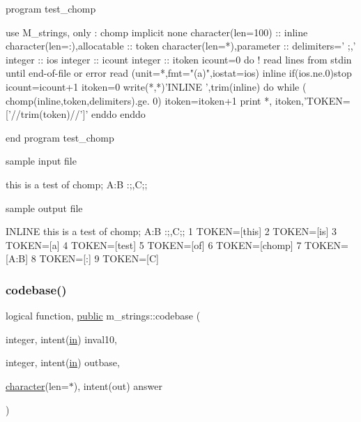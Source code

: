 \begin{DoxyVerb}program test_chomp

   use M_strings, only : chomp
   implicit none
   character(len=100)            :: inline
   character(len=:),allocatable  :: token
   character(len=*),parameter    :: delimiters=' ;,'
   integer                       :: ios
   integer                       :: icount
   integer                       :: itoken
      icount=0
      do        ! read lines from stdin until end-of-file or error
         read (unit=*,fmt="(a)",iostat=ios) inline
         if(ios.ne.0)stop
         icount=icount+1
         itoken=0
         write(*,*)'INLINE ',trim(inline)
         do while ( chomp(inline,token,delimiters).ge. 0)
            itoken=itoken+1
            print *, itoken,'TOKEN=['//trim(token)//']'
         enddo
      enddo

end program test_chomp

sample input file

 this is a test of chomp; A:B :;,C;;

sample output file

 INLINE     this is a test of chomp; A:B :;,C;;
           1 TOKEN=[this]
           2 TOKEN=[is]
           3 TOKEN=[a]
           4 TOKEN=[test]
           5 TOKEN=[of]
           6 TOKEN=[chomp]
           7 TOKEN=[A:B]
           8 TOKEN=[:]
           9 TOKEN=[C] \end{DoxyVerb}
 \mbox{\label{namespacem__strings_a3a022b64dc902dc6043e3f265ee78e38}} 
\subsubsection{\texorpdfstring{codebase()}{codebase()}}
{\footnotesize\ttfamily logical function, \hyperlink{M__stopwatch_83_8txt_a2f74811300c361e53b430611a7d1769f}{public} m\+\_\+strings\+::codebase (\begin{DoxyParamCaption}\item[{integer, intent(\hyperlink{M__journal_83_8txt_afce72651d1eed785a2132bee863b2f38}{in})}]{inval10,  }\item[{integer, intent(\hyperlink{M__journal_83_8txt_afce72651d1eed785a2132bee863b2f38}{in})}]{outbase,  }\item[{\hyperlink{option__stopwatch_83_8txt_abd4b21fbbd175834027b5224bfe97e66}{character}(len=$\ast$), intent(out)}]{answer }\end{DoxyParamCaption})}



